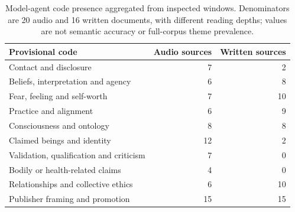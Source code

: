 \begin{table}[t]
\centering\small
\begin{tabular}{p{}rr}
\toprule
Provisional code & Audio sources & Written sources\\
\midrule
Contact and disclosure & 7 & 2\\
Beliefs, interpretation and agency & 6 & 8\\
Fear, feeling and self-worth & 7 & 10\\
Practice and alignment & 6 & 9\\
Consciousness and ontology & 8 & 8\\
Claimed beings and identity & 12 & 2\\
Validation, qualification and criticism & 7 & 0\\
Bodily or health-related claims & 4 & 0\\
Relationships and collective ethics & 6 & 10\\
Publisher framing and promotion & 15 & 15\\
\bottomrule
\end{tabular}
\caption{Model-agent code presence aggregated from inspected windows. Denominators are 20 audio and 16 written documents, with different reading depths; values are not semantic accuracy or full-corpus theme prevalence.}
\end{table}
